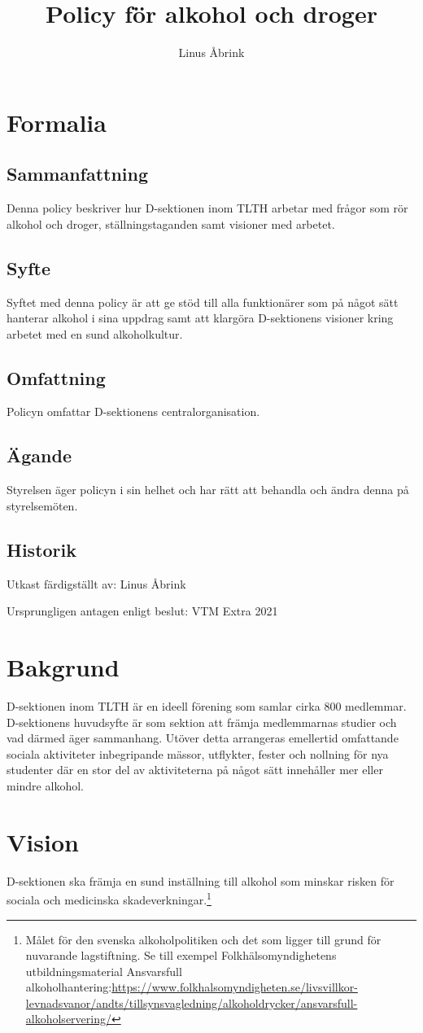 \documentclass[]{dsekkallelse}
\title{Policy för alkohol och droger}
\author{Linus Åbrink}
\begin{document}
\section{Formalia}

\subsection{Sammanfattning}
Denna policy beskriver hur D-sektionen inom TLTH arbetar med frågor som rör alkohol och droger, ställningstaganden samt visioner med arbetet.

\subsection{Syfte}
Syftet med denna policy är att ge stöd till alla funktionärer som på något sätt hanterar alkohol
i sina uppdrag samt att klargöra D-sektionens visioner kring arbetet med en sund alkoholkultur.

\subsection{Omfattning}
Policyn omfattar D-sektionens centralorganisation.

\subsection{Ägande}
Styrelsen äger policyn i sin helhet och har rätt att behandla och ändra denna på styrelsemöten.

\subsection{Historik}
Utkast färdigställt av: Linus Åbrink

Ursprungligen antagen enligt beslut: VTM Extra 2021


\section{Bakgrund}
D-sektionen inom TLTH är en ideell förening som samlar cirka 800 medlemmar. D-sektionens huvudsyfte är som sektion att främja medlemmarnas studier och vad därmed äger sammanhang. Utöver detta arrangeras emellertid omfattande sociala aktiviteter inbegripande mässor, utflykter, fester och nollning för nya studenter där en stor del av aktiviteterna på något sätt innehåller mer eller mindre alkohol.

\section{Vision}
D-sektionen ska främja en sund inställning till alkohol som minskar risken för sociala och
medicinska skadeverkningar.\footnote{Målet för den svenska alkoholpolitiken och det som ligger till grund för nuvarande lagstiftning. Se till exempel Folkhälsomyndighetens utbildningsmaterial Ansvarsfull alkoholhantering:\url{https://www.folkhalsomyndigheten.se/livsvillkor-levnadsvanor/andts/tillsynsvagledning/alkoholdrycker/ansvarsfull-alkoholservering/}
}
\end{document}
